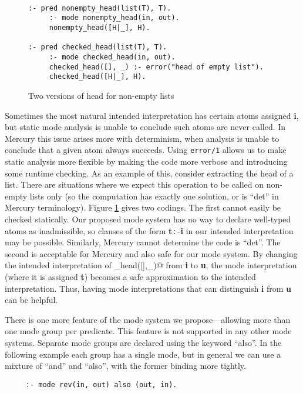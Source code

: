 \documentclass{tlp}
\begin{document}
\begin{figure}
\begin{verbatim}

:- pred nonempty_head(list(T), T).
     :- mode nonempty_head(in, out).
     nonempty_head([H|_], H).

:- pred checked_head(list(T), T).
     :- mode checked_head(in, out).
     checked_head([], _) :- error("head of empty list").
     checked_head([H|_], H).
\end{verbatim}
\caption{Two versions of head for non-empty lists\label{fig-head}}
\end{figure}

Sometimes the most natural intended interpretation has certain atoms
assigned \textbf{i}, but static mode analysis is unable to conclude
such atoms are never called.  In Mercury this issue arises more with
determinism, when analysis is unable to conclude that a given
atom always succeeds.
Using \texttt{error/1} allows us to make static analysis more flexible
by making the code more verbose and introducing some runtime checking.
As an example of this, consider extracting the head of a list.  
There are situations
where we expect this operation to be called on non-empty lists only
(so the computation has exactly one solution, or is ``det'' in Mercury
terminology).  Figure \ref{fig-head} gives two codings.  The first
cannot easily be checked statically.  Our proposed mode system has
no way to declare well-typed atoms as inadmissible, so clauses of the
form \textbf{t}\texttt{:-}\textbf{i} in our intended interpretation may
be possible.  Similarly, Mercury cannot determine the code is ``det''.
The second is acceptable for Mercury and also safe for our mode system.
By changing the intended interpretation of \verb@checked_head([],_)@ from
\textbf{i} to \textbf{u}, the mode interpretation (where it is assigned
\textbf{t}) becomes a safe approximation to the intended interpretation.
Thus, having mode interpretations that can distinguish \textbf{i} 
from \textbf{u} can be helpful.

There is one more feature of the mode system we propose---allowing more
than one mode group per predicate.  This feature is not supported in any
other mode systems.  Separate mode groups are declared using the keyword
``also''.  In the following example each group has a single mode, but in
general we can use a mixture of ``and'' and ``also'', with the former
binding more tightly.

\begin{verbatim}
     :- mode rev(in, out) also (out, in).
\end{verbatim}
\end{document}
